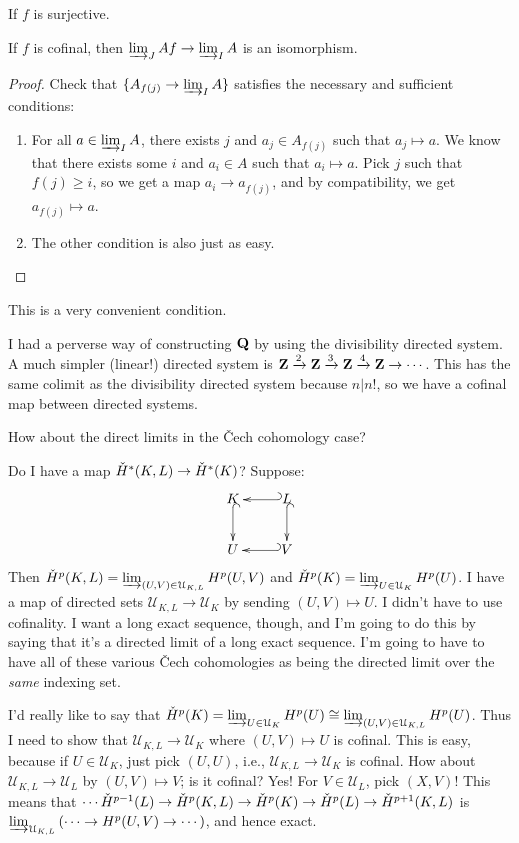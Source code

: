 \begin{example}
If $f$ is surjective.
\end{example}
\begin{lemma}
If $f$ is cofinal, then $\varinjlim_{J}Af\to\varinjlim_{I}A$ is an isomorphism.
\end{lemma}
\begin{proof}
Check that $\{A_{f(j)}\to\varinjlim_{I}A\}$ satisfies the necessary and sufficient conditions:
\begin{enumerate}
\item For all $a\in\varinjlim_{I}A$, there exists $j$ and $a_j\in A_{f(j)}$ such that $a_j\mapsto a$. We know that there exists some $i$ and $a_i\in A$ such that $a_i\mapsto a$. Pick $j$ such that $f(j)\geq i$, so we get a map $a_i\to a_{f(j)}$, and by compatibility, we get $a_{f(j)}\mapsto a$.
\item The other condition is also just as easy.
\end{enumerate}
\end{proof}
This is a very convenient condition.
\begin{example}
I had a perverse way of constructing $\mathbf Q$ by using the divisibility directed system. A much simpler (linear!) directed system is $\mathbf Z\xrightarrow{2}\mathbf Z\xrightarrow{3}\mathbf Z\xrightarrow{4}\mathbf Z\to\cdots$. This has the same colimit as the divisibility directed system because $n|n!$, so we have a cofinal map between directed systems.
\end{example}
How about the direct limits in the \v{C}ech cohomology case?
\begin{example}
Do I have a map $\check{H}^\ast(K,L)\to\check{H}^\ast(K)$? Suppose:
\begin{equation*}
\xymatrix{K\ar@{^(->}[d] & L\ar@{^(->}[d]\ar@{_(->}[l] \\ U & V\ar@{_(->}[l]}
\end{equation*}
Then $\check{H}^p(K,L)=\varinjlim_{(U,V)\in\mathcal{U}_{K,L}}H^p(U,V)$ and $\check{H}^p(K)=\varinjlim_{U\in\mathcal{U}_K}H^p(U)$. I have a map of directed sets $\mathcal{U}_{K,L}\to\mathcal{U}_K$ by sending $(U,V)\mapsto U$. I didn't have to use cofinality. I want a long exact sequence, though, and I'm going to do this by saying that it's a directed limit of a long exact sequence. I'm going to have to have all of these various \v{C}ech cohomologies as being the directed limit over the \emph{same} indexing set.

I'd really like to say that $\check{H}^p(K)=\varinjlim_{U\in\mathcal{U}_K}H^p(U)\cong \varinjlim_{(U,V)\in\mathcal{U}_{K,L}}H^p(U)$. Thus I need to show that $\mathcal{U}_{K,L}\to\mathcal{U}_K$ where $(U,V)\mapsto U$ is cofinal. This is easy, because if $U\in\mathcal{U}_K$, just pick $(U,U)$, i.e., $\mathcal{U}_{K,L}\to\mathcal{U}_K$ is cofinal. How about $\mathcal{U}_{K,L}\to\mathcal{U}_L$ by $(U,V)\mapsto V$; is it cofinal? Yes! For $V\in\mathcal{U}_L$, pick $(X,V)$! This means that $\cdots\check{H}^{p-1}(L)\to\check{H}^p(K,L)\to\check{H}^p(K)\to\check{H}^p(L)\to\check{H}^{p+1}(K,L)$ is $\varinjlim_{\mathcal{U}_{K,L}}\left(\cdots\to H^{p}(U,V)\to\cdots\right)$, and hence exact.
\end{example}
